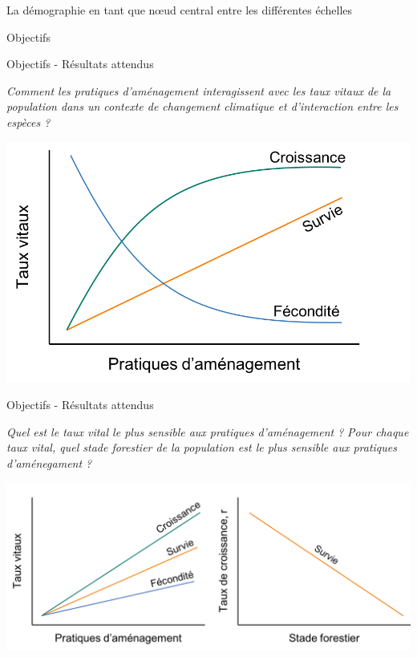 \documentclass[11pt, compress, aspectratio=1610]{beamer}
\begin{document}
\begin{frame}{La démographie en tant que nœud central entre les
différentes échelles}
\begin{frame}{Objectifs}
\end{frame}

\begin{frame}{Objectifs - Résultats attendus}
\protect\hypertarget{objectifs---ruxe9sultats-attendus-3}{}

\centering

\emph{Comment les pratiques d’aménagement interagissent avec les taux
vitaux de la population dans un contexte de changement climatique et
d’interaction entre les espèces ?}

\vspace*{10mm}
\centering

\includegraphics[scale=0.45]{figures/output_chap3a.png}

\par

\end{frame}

\begin{frame}{Objectifs - Résultats attendus}
\protect\hypertarget{objectifs---ruxe9sultats-attendus-4}{}

\centering

\emph{Quel est le taux vital le plus sensible aux pratiques
d’aménagement ?} \newline \emph{Pour chaque taux vital, quel stade
forestier de la population est le plus sensible aux pratiques
d’aménegament ?}

\vspace*{10mm}
\centering

\includegraphics[scale=0.45]{figures/output_chap3b.png}


\end{frame}
\end{frame}
\end{document}
